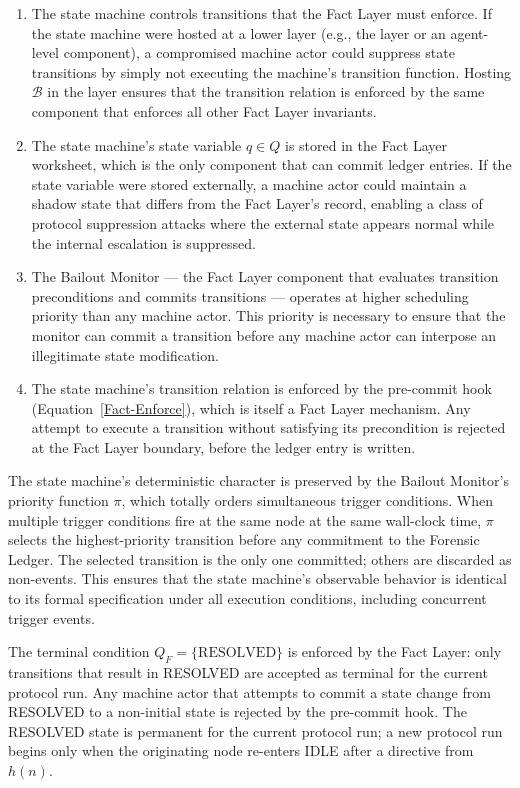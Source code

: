 \begin{enumerate}
\item The state machine controls transitions that the Fact Layer must enforce. If the state machine were hosted at a lower layer (e.g., the \bounds{} layer or an agent-level component), a compromised machine actor could suppress state transitions by simply not executing the machine's transition function. Hosting $\mathcal{B}$ in the \fact{} layer ensures that the transition relation is enforced by the same component that enforces all other Fact Layer invariants.

\item The state machine's state variable $q \in Q$ is stored in the Fact Layer worksheet, which is the only component that can commit ledger entries. If the state variable were stored externally, a machine actor could maintain a shadow state that differs from the Fact Layer's record, enabling a class of protocol suppression attacks where the external state appears normal while the internal escalation is suppressed.

\item The Bailout Monitor — the Fact Layer component that evaluates transition preconditions and commits transitions — operates at higher scheduling priority than any machine actor. This priority is necessary to ensure that the monitor can commit a transition before any machine actor can interpose an illegitimate state modification.

\item The state machine's transition relation is enforced by the pre-commit hook (Equation~\ref{Fact-Enforce}), which is itself a Fact Layer mechanism. Any attempt to execute a transition without satisfying its precondition is rejected at the Fact Layer boundary, before the ledger entry is written.
\end{enumerate}

The state machine's deterministic character is preserved by the Bailout Monitor's priority function $\pi$, which totally orders simultaneous trigger conditions. When multiple trigger conditions fire at the same node at the same wall-clock time, $\pi$ selects the highest-priority transition before any commitment to the Forensic Ledger. The selected transition is the only one committed; others are discarded as non-events. This ensures that the state machine's observable behavior is identical to its formal specification under all execution conditions, including concurrent trigger events.

The terminal condition $Q_F = \{\text{RESOLVED}\}$ is enforced by the Fact Layer: only transitions that result in RESOLVED are accepted as terminal for the current protocol run. Any machine actor that attempts to commit a state change from RESOLVED to a non-initial state is rejected by the pre-commit hook. The RESOLVED state is permanent for the current protocol run; a new protocol run begins only when the originating node re-enters IDLE after a directive from $h(n)$.

